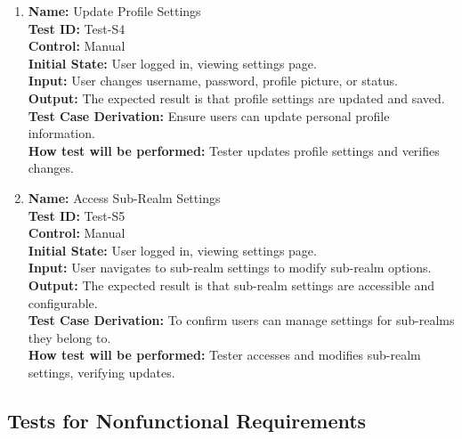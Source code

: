 \documentclass[12pt, titlepage]{article}
\begin{document}
\begin{enumerate}
    \item \textbf{Name:} {Update Profile Settings} \label{itm:Test-S4}\\
    \textbf{Test ID:} Test-S4\\
    \textbf{Control:} Manual \\
    \textbf{Initial State:} User logged in, viewing settings page. \\
    \textbf{Input:} User changes username, password, profile picture, or status. \\
    \textbf{Output:} The expected result is that profile settings are updated and saved. \\
    \textbf{Test Case Derivation:} Ensure users can update personal profile information. \\
    \textbf{How test will be performed:} Tester updates profile settings and verifies changes.

    \item \textbf{Name:} {Access Sub-Realm Settings} \label{itm:Test-S5}\\
    \textbf{Test ID:} Test-S5\\
    \textbf{Control:} Manual \\
    \textbf{Initial State:} User logged in, viewing settings page. \\
    \textbf{Input:} User navigates to sub-realm settings to modify sub-realm options. \\
    \textbf{Output:} The expected result is that sub-realm settings are accessible and configurable. \\
    \textbf{Test Case Derivation:} To confirm users can manage settings for sub-realms they belong to. \\
    \textbf{How test will be performed:} Tester accesses and modifies sub-realm settings, verifying updates.

\end{enumerate}

\subsection{Tests for Nonfunctional Requirements}


\end{document}
